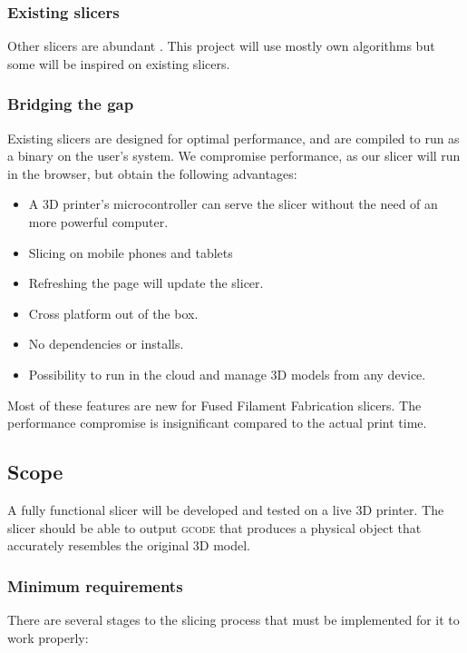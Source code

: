 \subsubsection{Existing slicers}
Other slicers are abundant \cite{gh:curaengine, gh:slic3r}. This project will use mostly own algorithms but some will be inspired on existing slicers.

\subsubsection{Bridging the gap}
Existing slicers are designed for optimal performance, and are compiled to run as a binary on the user's system. We compromise performance, as our slicer will run in the browser, but obtain the following advantages:

\begin{itemize}
    \item A 3D printer's microcontroller can serve the slicer without the need of an more powerful computer.
    \item Slicing on mobile phones and tablets
    \item Refreshing the page will update the slicer.
    \item Cross platform out of the box.
    \item No dependencies or installs.
    \item Possibility to run in the cloud and manage 3D models from any device.
\end{itemize}

Most of these features are new for Fused Filament Fabrication slicers. The performance compromise is insignificant compared to the actual print time.






\subsection{Scope}
A fully functional slicer will be developed and tested on a live 3D printer. The slicer should be able to output \textsc{gcode} that produces a physical object that accurately resembles the original 3D model.

\subsubsection{Minimum requirements}
There are several stages to the slicing process that must be implemented for it to work properly:

